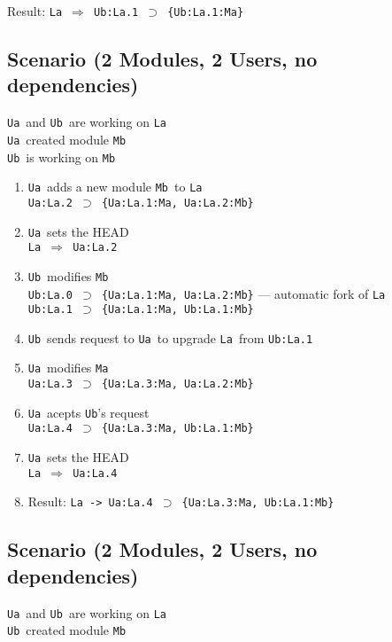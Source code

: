 \documentclass[10pt]{article}
\def\Ua{{\tt Ua}}
\def\Ub{{\tt Ub}}
\def\La{{\tt La}}
\def\Ma{{\tt Ma}}
\def\Mb{{\tt Mb}}
\def\headsto{${\Longrightarrow}$ }
\def\hto{\headsto}
\def\eq{${\supset}$ }
\begin{document}
		\noindent Result: {\tt La \hto  Ub:La.1 \eq \{Ub:La.1:Ma\}}

	\subsection{Scenario (2 Modules, 2 Users, no dependencies)}

		\Ua\ and \Ub\ are working on \La\\ 
		\Ua\ created module \Mb\\
		\Ub\ is working on \Mb\
		
		\begin{enumerate}
			\item{\Ua\ adds a new module \Mb\ to \La\\
				{\tt Ua:La.2 \eq \{Ua:La.1:Ma, Ua:La.2:Mb\}}
			}
			\item{\Ua\ sets the HEAD\\
				{\tt La \hto Ua:La.2}
			}
			\item{\Ub\ modifies \Mb\\				
				{\tt Ub:La.0 \eq \{Ua:La.1:Ma, Ua:La.2:Mb\}} --- automatic fork of \La\\
				{\tt Ub:La.1 \eq \{Ua:La.1:Ma, Ub:La.1:Mb\}}
			}
			\item{\Ub\ sends request to \Ua\ to upgrade \La\ from {\tt Ub:La.1}}
			\item{\Ua\ modifies \Ma\\
				{\tt Ua:La.3 \eq \{Ua:La.3:Ma, Ua:La.2:Mb\}}
			}
			\item{\Ua\ acepts \Ub's request\\
				{\tt Ua:La.4 \eq \{Ua:La.3:Ma, Ub:La.1:Mb\}}
			}
			\item{\Ua\ sets the HEAD\\
				{\tt La \hto Ua:La.4}
			}
			\item{Result: {\tt La -> Ua:La.4 \eq \{Ua:La.3:Ma, Ub:La.1:Mb\}}}
		\end{enumerate}

	\subsection{Scenario (2 Modules, 2 Users, no dependencies)}
	
		\Ua\ and \Ub\ are working on \La\\ 
		\Ub\ created module \Mb\
		
\end{document}
